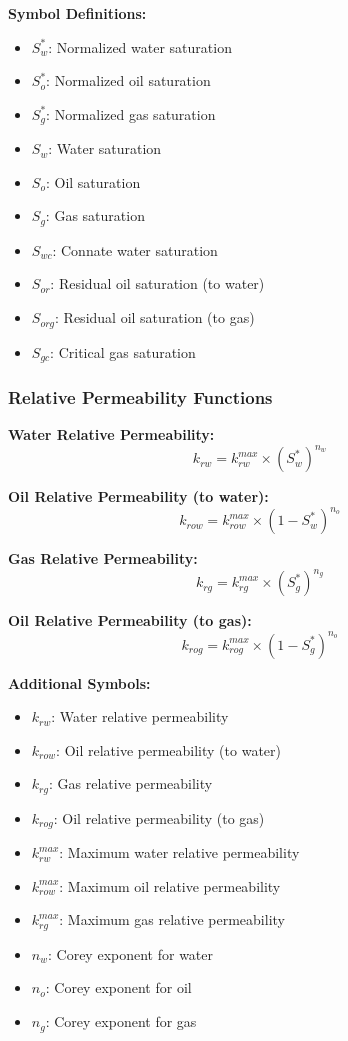\documentclass[11pt,a4paper]{article}
\newcommand{\symitem}[2]{\item \textbf{#1}: #2}
\begin{document}
\textbf{Symbol Definitions:}
\begin{itemize}[leftmargin=2cm]
\symitem{$S_w^*$}{Normalized water saturation}
\symitem{$S_o^*$}{Normalized oil saturation}
\symitem{$S_g^*$}{Normalized gas saturation}
\symitem{$S_w$}{Water saturation}
\symitem{$S_o$}{Oil saturation}
\symitem{$S_g$}{Gas saturation}
\symitem{$S_{wc}$}{Connate water saturation}
\symitem{$S_{or}$}{Residual oil saturation (to water)}
\symitem{$S_{org}$}{Residual oil saturation (to gas)}
\symitem{$S_{gc}$}{Critical gas saturation}
\end{itemize}

\subsubsection{Relative Permeability Functions}

\begin{tcolorbox}[colback=formulabox,colframe=black!75]
\textbf{Water Relative Permeability:}
\begin{equation}
k_{rw} = k_{rw}^{max} \times (S_w^*)^{n_w}
\end{equation}

\textbf{Oil Relative Permeability (to water):}
\begin{equation}
k_{row} = k_{row}^{max} \times (1 - S_w^*)^{n_o}
\end{equation}

\textbf{Gas Relative Permeability:}
\begin{equation}
k_{rg} = k_{rg}^{max} \times (S_g^*)^{n_g}
\end{equation}

\textbf{Oil Relative Permeability (to gas):}
\begin{equation}
k_{rog} = k_{rog}^{max} \times (1 - S_g^*)^{n_o}
\end{equation}
\end{tcolorbox}

\textbf{Additional Symbols:}
\begin{itemize}[leftmargin=2cm]
\symitem{$k_{rw}$}{Water relative permeability}
\symitem{$k_{row}$}{Oil relative permeability (to water)}
\symitem{$k_{rg}$}{Gas relative permeability}
\symitem{$k_{rog}$}{Oil relative permeability (to gas)}
\symitem{$k_{rw}^{max}$}{Maximum water relative permeability}
\symitem{$k_{row}^{max}$}{Maximum oil relative permeability}
\symitem{$k_{rg}^{max}$}{Maximum gas relative permeability}
\symitem{$n_w$}{Corey exponent for water}
\symitem{$n_o$}{Corey exponent for oil}
\symitem{$n_g$}{Corey exponent for gas}
\end{itemize}
\end{document}
